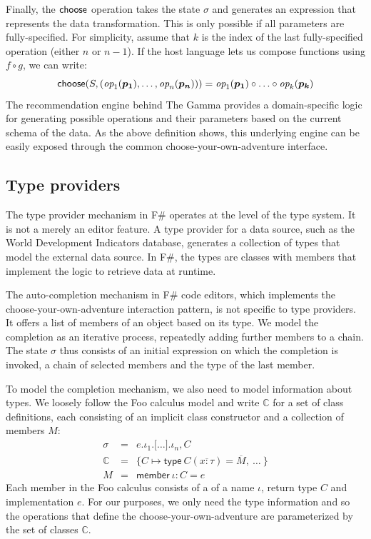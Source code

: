 \documentclass[a4paper,UKenglish,cleveref, autoref, thm-restate]{lipics-v2021}
\newcommand{\ident}[1]{\textsf{#1}}
\newcommand{\select}{\textnormal{\ident{choose}}}
\newcommand{\op}{\textit{op}}
\begin{document}
Finally, the $\select$ operation takes the state $\sigma$ and generates an expression that represents
the data transformation. This is only possible if all parameters are fully-specified. For simplicity,
assume that $k$ is the index of the last fully-specified operation (either $n$ or $n-1$). If the
host language lets us compose functions using $f\circ g$, we can write:
\[
\select(S, (\op_1(\boldsymbol{p_1}), \ldots, \op_n(\boldsymbol{p_n}))) = \op_1(\boldsymbol{p_1}) \circ \ldots \circ \op_k(\boldsymbol{p_k})
\]
The recommendation engine behind The Gamma provides a domain-specific logic for generating
possible operations and their parameters based on the current schema of the data. As the above
definition shows, this underlying engine can be easily exposed through the common
choose-your-own-adventure interface.

\subsection{Type providers}
The type provider mechanism in F\# operates at the level of the type system. It is not a merely an
editor feature. A type provider for a data source, such as the World Development Indicators database,
generates a collection of types that model the external data source. In F\#, the types are classes
with members that implement the logic to retrieve data at runtime.

The auto-completion mechanism in F\# code editors, which implements the choose-your-own-adventure
interaction pattern, is not specific to type providers. It offers a list of members of an object
based on its type. We model the completion as an iterative process, repeatedly adding further
members to a chain. The state $\sigma$ thus consists of an initial expression on which the
completion is invoked, a chain of selected members and the type of the last member.

To model the completion mechanism, we also need to model information about types. We loosely
follow the Foo calculus model \cite{petricek-2016-fsdata} and write $\mathbb{C}$ for a set
of class definitions, each consisting of an implicit class constructor and a collection of
members $M$:
\[
\begin{array}{rcl}
\sigma &=& e . \iota_1 . \lbrack\ldots\rbrack . \iota_n, C\\
\mathbb{C} &=& \{ C \mapsto \ident{type}~C(\overline{x:\tau}) = \overline{M},~\ldots~ \}\\
M &=& \ident{member}~\iota\!:\!C=e
\end{array}
\]
Each member in the Foo calculus consists of a of a name $\iota$, return type $C$ and implementation
$e$. For our purposes, we only need the type information and so the operations that define the
choose-your-own-adventure are parameterized by the set of classes $\mathbb{C}$.
\end{document}
